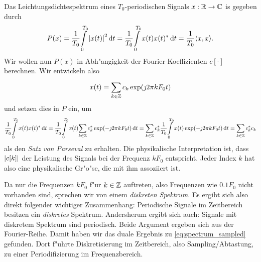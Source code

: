 Das Leichtungsdichtespektrum eines $T_0$-periodischen Signals $x: \mathbb{R} \rightarrow \mathbb{C}$ is gegeben durch
\begin{equation}\label{eq:fourier:period_psd}
P(x) = \frac{1}{T_0}{\int\limits_{0}^{T_0}{{\left| x(t) \right|}^2}\,\mathrm{d}{t}}
     = \frac{1}{T_0}{\int\limits_{0}^{T_0}{x(t) x(t)^\ast}\,\mathrm{d}{t}}
     = \frac{1}{T_0} {\left\langle x,x \right\rangle}.
\end{equation}
Wir wollen nun $P(x)$ in Abh"angigkeit der Fourier-Koeffizienten $c[\cdot]$ berechnen.
Wir entwickeln also
\[
x(t) = {\sum\limits_{k \in \mathbb{Z}}^{}{
    c_k \exp(\jmath 2 \pi k F_0 t)
}}
\]
und setzen dies in $P$ ein, um
%
\begin{equation}\label{eq:fourier:series_parseval}
    \frac{1}{T_0}{\int\limits_{0}^{T_0}{x(t) x(t)^\ast}\,\mathrm{d}{t}}
        = \frac{1}{T_0}{\int\limits_{0}^{T_0}{
            x(t) 
            {\sum\limits_{k \in \mathbb{Z}}^{}{
                c_k^\ast \exp(-\jmath 2 \pi k F_0 t)
            }}
        }\,\mathrm{d}{t}}
        = {\sum\limits_{k \in \mathbb{Z}}^{}{
            c_k^\ast 
            \frac{1}{T_0}{\int\limits_{0}^{T_0}{
                x(t)
                \exp(-\jmath 2 \pi k F_0 t)
            }\,\mathrm{d}{t}}
        }}
        = {\sum\limits_{k \in \mathbb{Z}}^{}{
            c_k^\ast c_k
        }}
\end{equation}
%
als den \emph{Satz von Parseval} zu erhalten.
Die physikalische Interpretation ist, dass ${\left| c[k] \right|}$ der Leistung des Signals bei der Frequenz $k F_0$ entspricht.
Jeder Index $k$ hat also eine physikalische Gr"o"se, die mit ihm assoziiert ist.

Da nur die Frequenzen $k F_0$ f"ur $k \in \mathbb{Z}$ auftreten, also Frequenzen wie $0.1 F_0$ nicht vorhanden sind, sprechen wir von einem \emph{diskreten Spektrum}.
Es ergibt sich also direkt folgender wichtiger Zusammenhang: Periodische Signale im Zeitbereich besitzen ein \emph{diskretes} Spektrum.
Andersherum ergibt sich auch: Signale mit diskretem Spektrum sind periodisch.
Beide Argument ergeben sich aus der Fourier-Reihe.
Damit haben wir das duale Ergebnis zu \eqref{eq:spectrum_sampled} gefunden.
Dort f"uhrte Diskretisierung im Zeitbereich, also Sampling/Abtastung, zu einer Periodifizierung im Frequenzbereich.

